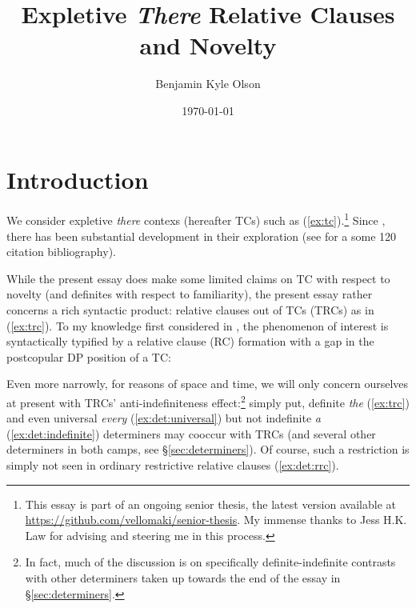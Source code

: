 \documentclass[11pt]{article}
\title{Expletive \textit{There} Relative Clauses and Novelty}
\author{Benjamin Kyle Olson}
\date{\today}
\begin{document}
\maketitle

\section{Introduction}
We consider expletive \textit{there} contexs (hereafter TCs) such as (\ref{ex:tc}).\footnote{This essay is part of an ongoing senior thesis, the latest version available at \url{https://github.com/vellomaki/senior-thesis}. My immense thanks to Jess H.K. Law for advising and steering me in this process.} Since \citet{milsarkExistentialSentencesEnglish1974}, there has been substantial development in their exploration (see \cite{mcnallyExistential2011} for a some 120 citation bibliography).

\begin{exe}
	\label{ex:tc}
\end{exe}

While the present essay does make some limited claims on TC with respect to novelty (and definites with respect to familiarity), the present essay rather concerns a rich syntactic product: relative clauses out of TCs (TRCs) as in (\ref{ex:trc}). To my knowledge first considered in \citet{carlsonAmountRelatives1977}, the phenomenon of interest is syntactically typified by a relative clause (RC) formation with a gap in the postcopular DP position of a TC:

\begin{exe}
	\label{ex:trc}
\end{exe}

Even more narrowly, for reasons of space and time, we will only concern ourselves at present with TRCs' anti-indefiniteness effect:\footnote{In fact, much of the discussion is on specifically definite-indefinite contrasts with other determiners taken up towards the end of the essay in \S\ref{sec:determiners}.} simply put, definite \textit{the} (\ref{ex:trc}) and even universal \textit{every} (\ref{ex:det:universal}) but not indefinite \textit{a} (\ref{ex:det:indefinite}) determiners may cooccur with TRCs (and several other determiners in both camps, see \S\ref{sec:determiners}). Of course, such a restriction is simply not seen in ordinary restrictive relative clauses (\ref{ex:det:rrc}).
\end{document}
